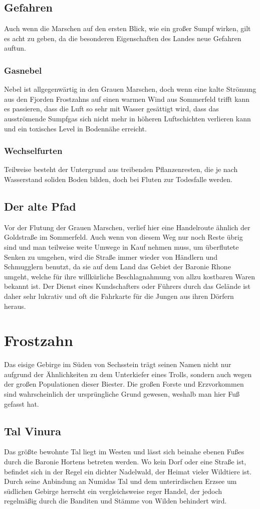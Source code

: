 \documentclass[a4paper,12pt,oneside]{book}
\begin{document}
\subsection{Gefahren}
Auch wenn die Marschen auf den ersten Blick, wie ein großer Sumpf wirken, gilt es acht zu geben, da die besonderen Eigenschaften des Landes neue Gefahren auftun.
\subsubsection{Gasnebel}
Nebel ist allgegenwärtig in den Grauen Marschen, doch wenn eine kalte Strömung aus den Fjorden Frostzahns auf einen warmen Wind aus Sommerfeld trifft kann es passieren, dass die Luft so sehr mit Wasser gesättigt wird, dass das ausströmende Sumpfgas sich nicht mehr in höheren Luftschichten verlieren kann und ein toxisches Level in Bodennähe erreicht.
\subsubsection{Wechselfurten}
Teilweise besteht der Untergrund aus treibenden Pflanzenresten, die je nach Wasserstand soliden Boden bilden, doch bei Fluten zur Todesfalle werden.
\subsection{Der alte Pfad}
Vor der Flutung der Grauen Marschen, verlief hier eine Handelroute ähnlich der Goldstraße im Sommerfeld. Auch wenn von diesem Weg nur noch Reste übrig sind und man teilweise weite Umwege in Kauf nehmen muss, um überflutete Senken zu umgehen, wird die Straße immer wieder von Händlern und Schmugglern benutzt, da sie auf dem Land das Gebiet der Baronie Rhone umgeht, welche für ihre willkürliche Beschlagnahmung von allzu kostbaren Waren bekannt ist. Der Dienst eines Kundschafters oder Führers durch das Gelände ist daher sehr lukrativ und oft die Fahrkarte für die Jungen aus ihren Dörfern heraus.
\section{Frostzahn}
Das eisige Gebirge im Süden von Sechsstein trägt seinen Namen nicht nur aufgrund der Ähnlichkeiten zu dem Unterkiefer eines Trolls, sondern auch wegen der großen Populationen dieser Biester. Die großen Forste und Erzvorkommen sind wahrscheinlich der ursprüngliche Grund gewesen, weshalb man hier Fuß gefasst hat.
\subsection{Tal Vinura}
Das größte bewohnte Tal liegt im Westen und lässt sich beinahe ebenen Fußes durch die Baronie Hortens betreten werden. Wo kein Dorf oder eine Straße ist, befindet sich in der Regel ein dichter Nadelwald, der Heimat vieler Wildtiere ist. Durch seine Anbindung an Numidas Tal und dem unterirdischen Erzsee um südlichen Gebirge herrscht ein vergleichsweise reger Handel, der jedoch regelmäßig durch die Banditen und Stämme von Wilden behindert wird.
\end{document}

